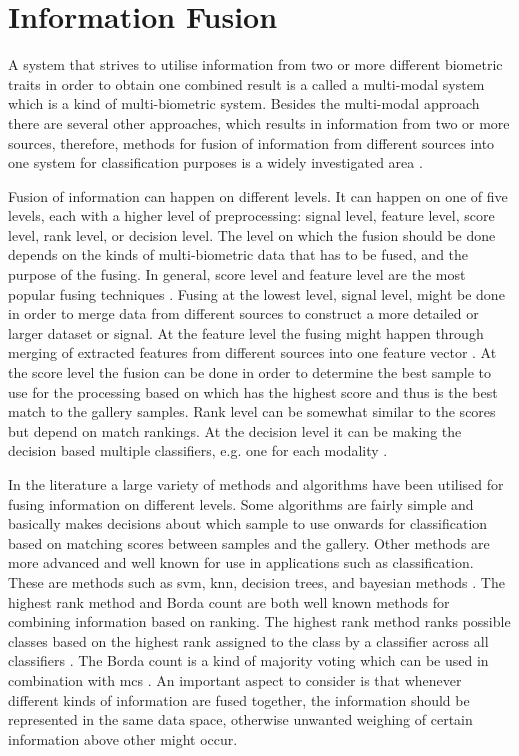 \section{Information Fusion}
\label{sec:info_fuse}

A system that strives to utilise information from two or more different biometric traits in order to obtain one combined result is a called a multi-modal system which is a kind of multi-biometric system. Besides the multi-modal approach there are several other approaches, which results in information from two or more sources, therefore, methods for fusion of information from different sources into one system for classification purposes is a widely investigated area \citep{Bowyer2016b}.

Fusion of information can happen on different levels. It can happen on one of five levels, each with a higher level of preprocessing: signal level, feature level, score level, rank level, or decision level. The level on which the fusion should be done depends on the kinds of multi-biometric data that has to be fused, and the purpose of the fusing. In general, score level and feature level are the most popular fusing techniques \citep{Bowyer2016b}. Fusing at the lowest level, signal level, might be done in order to merge data from different sources to construct a more detailed or larger dataset or signal. At the feature level the fusing might happen through merging of extracted features from different sources into one feature vector \citep{Ross2003}. At the score level the fusion can be done in order to determine the best sample to use for the processing based on which has the highest score and thus is the best match to the gallery samples. Rank level can be somewhat similar to the scores but depend on match rankings. At the decision level it can be making the decision based multiple classifiers, e.g. one for each modality \citep{Fierrez2018b}.

In the literature a large variety of methods and algorithms have been utilised for fusing information on different levels. Some algorithms are fairly simple and basically makes decisions about which sample to use onwards for classification based on matching scores between samples and the gallery. Other methods are more advanced and well known for use in applications such as classification. These are methods such as \gls{svm}, \gls{knn}, decision trees, and bayesian methods \citep{Ross2003}. The highest rank method and Borda count are both well known methods for combining information based on ranking. The highest rank method ranks possible classes based on the highest rank assigned to the class by a classifier across all classifiers \citep{Ho1994}. The Borda count is a kind of majority voting which can be used in combination with \gls{mcs} \citep{Bowyer2016b,Ho1994}. An important aspect to consider is that whenever  different kinds of information are fused together, the information should be represented in the same data space, otherwise unwanted weighing of certain information above other might occur.  

